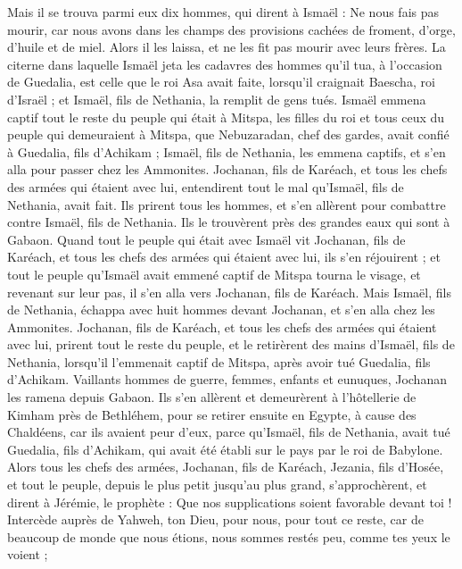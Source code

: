 \begin{multicols}{2}
Mais il se trouva parmi eux dix hommes, qui dirent à Ismaël : Ne nous fais pas mourir, car nous avons dans les champs des provisions cachées de froment, d'orge, d'huile et de miel. Alors il les laissa, et ne les fit pas mourir avec leurs frères.
La citerne dans laquelle Ismaël jeta les cadavres des hommes qu'il tua, à l'occasion de Guedalia, est celle que le roi Asa avait faite, lorsqu'il craignait Baescha, roi d'Israël ; et Ismaël, fils de Nethania, la remplit de gens tués.
Ismaël emmena captif tout le reste du peuple qui était à Mitspa, les filles du roi et tous ceux du peuple qui demeuraient à Mitspa, que Nebuzaradan, chef des gardes, avait confié à Guedalia, fils d'Achikam ; Ismaël, fils de Nethania, les emmena captifs, et s'en alla pour passer chez les Ammonites.
Jochanan, fils de Karéach, et tous les chefs des armées qui étaient avec lui, entendirent tout le mal qu'Ismaël, fils de Nethania, avait fait.
Ils prirent tous les hommes, et s'en allèrent pour combattre contre Ismaël, fils de Nethania. Ils le trouvèrent près des grandes eaux qui sont à Gabaon.
Quand tout le peuple qui était avec Ismaël vit Jochanan, fils de Karéach, et tous les chefs des armées qui étaient avec lui, ils s'en réjouirent ;
et tout le peuple qu'Ismaël avait emmené captif de Mitspa tourna le visage, et revenant sur leur pas, il s'en alla vers Jochanan, fils de Karéach.
Mais Ismaël, fils de Nethania, échappa avec huit hommes devant Jochanan, et s'en alla chez les Ammonites.
Jochanan, fils de Karéach, et tous les chefs des armées qui étaient avec lui, prirent tout le reste du peuple, et le retirèrent des mains d'Ismaël, fils de Nethania, lorsqu'il l’emmenait captif de Mitspa, après avoir tué Guedalia, fils d'Achikam. Vaillants hommes de guerre, femmes, enfants et eunuques, Jochanan les ramena depuis Gabaon.
Ils s'en allèrent et demeurèrent à l’hôtellerie de Kimham près de Bethléhem, pour se retirer ensuite en Egypte,
à cause des Chaldéens, car ils avaient peur d'eux, parce qu'Ismaël, fils de Nethania, avait tué Guedalia, fils d'Achikam, qui avait été établi sur le pays par le roi de Babylone.
\VerseOne{}Alors tous les chefs des armées, Jochanan, fils de Karéach, Jezania, fils d’Hosée, et tout le peuple, depuis le plus petit jusqu’au plus grand, s'approchèrent,
et dirent à Jérémie, le prophète : Que nos supplications soient favorable devant toi ! Intercède auprès de Yahweh, ton Dieu, pour nous, pour tout ce reste, car de beaucoup de monde que nous étions, nous sommes restés peu, comme tes yeux le voient ;

\end{multicols}

